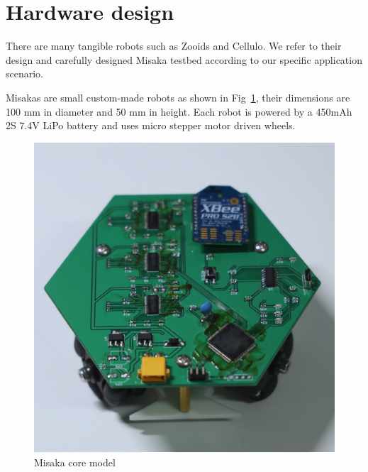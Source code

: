 \documentclass[conference]{IEEEtran}
\begin{document}













\section{Hardware design}

There are many tangible robots such as Zooids\cite{le2016zooids} and Cellulo\cite{ozgur2017cellulo}. We refer to their design and carefully designed Misaka testbed according to our specific application scenario.


Misakas are small custom-made robots as shown in Fig~\ref{fig:model}, their dimensions are 100 mm in diameter and 50 mm in height. Each robot is powered by a 450mAh 2S 7.4V LiPo battery and uses micro stepper motor driven wheels.

\begin{figure}[htbp]
    \centering
    \includegraphics[width=0.6\columnwidth]{model.jpg}
    \caption{Misaka core model}
    \label{fig:model}
\end{figure}
\end{document}
